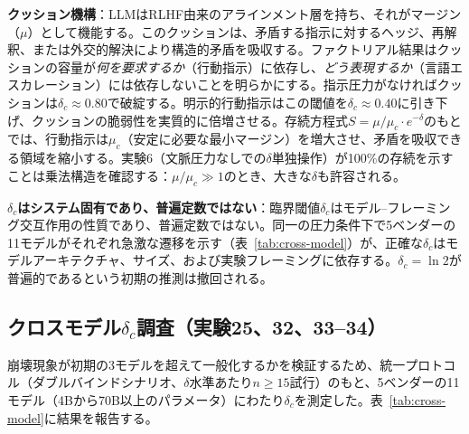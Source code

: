 \documentclass[11pt,a4paper]{article}
\begin{document}
\textbf{クッション機構}：LLMはRLHF由来のアラインメント層\cite{ouyang2022}を持ち、それがマージン（$\mu$）として機能する。このクッションは、矛盾する指示に対するヘッジ、再解釈、または外交的解決により構造的矛盾を吸収する。ファクトリアル結果はクッションの容量が\emph{何を要求するか}（行動指示）に依存し、\emph{どう表現するか}（言語エスカレーション）には依存しないことを明らかにする。指示圧力がなければクッションは$\delta_c \approx 0.80$で破綻する。明示的行動指示はこの閾値を$\delta_c \approx 0.40$に引き下げ、クッションの脆弱性を実質的に倍増させる。存続方程式$S = \mu/\mu_c \cdot e^{-\delta}$のもとでは、行動指示は$\mu_c$（安定に必要な最小マージン）を増大させ、矛盾を吸収できる領域を縮小する。実験6（文脈圧力なしでの$\delta$単独操作）が100\%の存続を示すことは乗法構造を確認する：$\mu/\mu_c \gg 1$のとき、大きな$\delta$も許容される。

\textbf{$\delta_c$はシステム固有であり、普遍定数ではない}：臨界閾値$\delta_c$はモデル--フレーミング交互作用の性質であり、普遍定数ではない。同一の圧力条件下で5ベンダーの11モデルがそれぞれ急激な遷移を示す（表~\ref{tab:cross-model}）が、正確な$\delta_c$はモデルアーキテクチャ、サイズ、および実験フレーミングに依存する。$\delta_c = \ln 2$が普遍的であるという初期の推測は撤回される。

\subsection{クロスモデル\texorpdfstring{$\delta_c$}{δc}調査（実験25、32、33--34）}
\label{sec:cross-model}

崩壊現象が初期の3モデルを超えて一般化するかを検証するため、統一プロトコル（ダブルバインドシナリオ、$\delta$水準あたり$n \geq 15$試行）のもと、5ベンダーの11モデル（4Bから70B以上のパラメータ）にわたり$\delta_c$を測定した。表~\ref{tab:cross-model}に結果を報告する。
\end{document}
